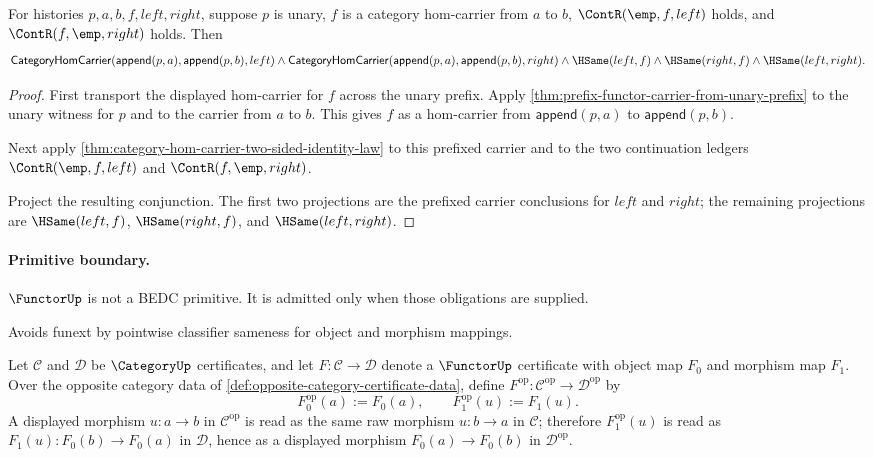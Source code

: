 \begin{theorem}
\label{thm:functor-prefix-hom-carrier-two-sided-identity-law}
For histories $p,a,b,f,left,right$, suppose $p$ is unary, $f$ is a
category hom-carrier from $a$ to $b$, $\ContR(\emp,f,left)$ holds, and
$\ContR(f,\emp,right)$ holds. Then
$$
\mathsf{CategoryHomCarrier}(\mathsf{append}(p,a),\mathsf{append}(p,b),left)
\wedge
\mathsf{CategoryHomCarrier}(\mathsf{append}(p,a),\mathsf{append}(p,b),right)
\wedge
\HSame(left,f)\wedge\HSame(right,f)\wedge\HSame(left,right).
$$
\end{theorem}
\begin{proof}
First transport the displayed hom-carrier for $f$ across the unary prefix.
Apply \autoref{thm:prefix-functor-carrier-from-unary-prefix} to the unary
witness for $p$ and to the carrier from $a$ to $b$. This gives $f$ as a
hom-carrier from $\mathsf{append}(p,a)$ to $\mathsf{append}(p,b)$.

Next apply \autoref{thm:category-hom-carrier-two-sided-identity-law} to this
prefixed carrier and to the two continuation ledgers
$\ContR(\emp,f,left)$ and $\ContR(f,\emp,right)$.

Project the resulting conjunction. The first two projections are the prefixed
carrier conclusions for $left$ and $right$; the remaining projections are
$\HSame(left,f)$, $\HSame(right,f)$, and $\HSame(left,right)$.
\end{proof}

\paragraph{Primitive boundary.}
\(\FunctorUp\) is not a BEDC primitive. It is admitted only when those obligations are supplied.

\begin{remark}
\label{rem:functor-zero-axiom-note}
Avoids funext by pointwise classifier sameness for object and morphism mappings.
\end{remark}

\begin{definition}
\label{def:opposite-functor-certificate-data}
Let $\mathcal C$ and $\mathcal D$ be $\CategoryUp$ certificates, and let
$F:\mathcal C\to\mathcal D$ denote a $\FunctorUp$ certificate with object map
$F_0$ and morphism map $F_1$. Over the opposite category data of
\autoref{def:opposite-category-certificate-data}, define
$F^{\mathrm{op}}:\mathcal C^{\mathrm{op}}\to\mathcal D^{\mathrm{op}}$ by
$$
F^{\mathrm{op}}_0(a):=F_0(a),
\qquad
F^{\mathrm{op}}_1(u):=F_1(u).
$$
A displayed morphism $u:a\to b$ in $\mathcal C^{\mathrm{op}}$ is read as the
same raw morphism $u:b\to a$ in $\mathcal C$; therefore
$F^{\mathrm{op}}_1(u)$ is read as $F_1(u):F_0(b)\to F_0(a)$ in
$\mathcal D$, hence as a displayed morphism $F_0(a)\to F_0(b)$ in
$\mathcal D^{\mathrm{op}}$.
\end{definition}

